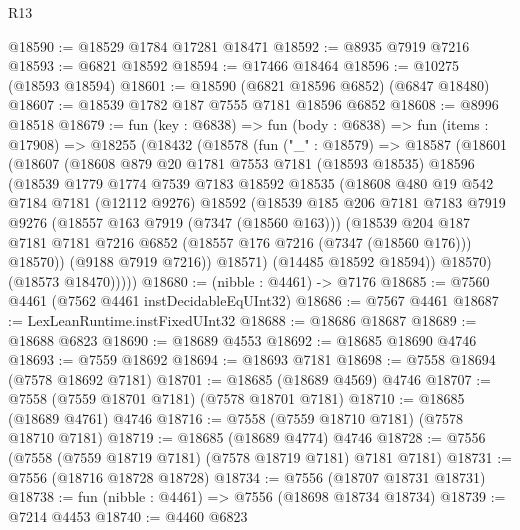 \begin{lexlean}{R13}
\begin{coremodule}
@18590 := @18529 @1784 @17281 @18471
@18592 := @8935 @7919 @7216
@18593 := @6821 @18592
@18594 := @17466 @18464
@18596 := @10275 (@18593 @18594)
@18601 := @18590 (@6821 @18596 @6852) (@6847 @18480)
@18607 := @18539 @1782 @187 @7555 @7181 @18596 @6852
@18608 := @8996 @18518
@18679 := fun (key : @6838) =>
  fun (body : @6838) =>
  fun (items : @17908) =>
  @18255
    (@18432
      (@18578
        (fun ("_" : @18579) =>
        @18587
          (@18601
            (@18607
              (@18608
                @879
                @20
                @1781
                @7553
                @7181
                (@18593 @18535)
                @18596
                (@18539
                  @1779
                  @1774
                  @7539
                  @7183
                  @18592
                  @18535
                  (@18608
                    @480
                    @19
                    @542
                    @7184
                    @7181
                    (@12112 @9276)
                    @18592
                    (@18539
                      @185
                      @206
                      @7181
                      @7183
                      @7919
                      @9276
                      (@18557 @163 @7919 (@7347 (@18560 @163)))
                      (@18539
                        @204
                        @187
                        @7181
                        @7181
                        @7216
                        @6852
                        (@18557 @176 @7216 (@7347 (@18560 @176)))
                        @18570))
                    (@9188 @7919 @7216))
                  @18571)
                (@14485 @18592 @18594))
              @18570)
            (@18573 @18470)))))
@18680 := (nibble : @4461) -> @7176
@18685 := @7560 @4461 (@7562 @4461 instDecidableEqUInt32)
@18686 := @7567 @4461
@18687 := LexLeanRuntime.instFixedUInt32
@18688 := @18686 @18687
@18689 := @18688 @6823
@18690 := @18689 @4553
@18692 := @18685 @18690 @4746
@18693 := @7559 @18692
@18694 := @18693 @7181
@18698 := @7558 @18694 (@7578 @18692 @7181)
@18701 := @18685 (@18689 @4569) @4746
@18707 := @7558 (@7559 @18701 @7181) (@7578 @18701 @7181)
@18710 := @18685 (@18689 @4761) @4746
@18716 := @7558 (@7559 @18710 @7181) (@7578 @18710 @7181)
@18719 := @18685 (@18689 @4774) @4746
@18728 := @7556 (@7558 (@7559 @18719 @7181) (@7578 @18719 @7181) @7181 @7181)
@18731 := @7556 (@18716 @18728 @18728)
@18734 := @7556 (@18707 @18731 @18731)
@18738 := fun (nibble : @4461) => @7556 (@18698 @18734 @18734)
@18739 := @7214 @4453
@18740 := @4460 @6823

\end{coremodule}
\end{lexlean}
